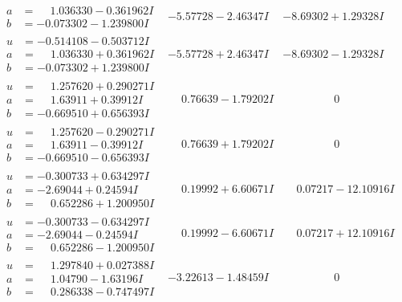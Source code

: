 \documentclass[1p]{elsarticle_modified}
\theoremstyle{definition}
\begin{document}
$$\begin{array}{c|c|c}
\begin{aligned}
a &= \phantom{-}1.036330 - 0.361962 I \\
b &= -0.073302 - 1.239800 I\end{aligned}
 & -5.57728 - 2.46347 I & -8.69302 + 1.29328 I \\ \hline\begin{aligned}
u &= -0.514108 - 0.503712 I \\
a &= \phantom{-}1.036330 + 0.361962 I \\
b &= -0.073302 + 1.239800 I\end{aligned}
 & -5.57728 + 2.46347 I & -8.69302 - 1.29328 I \\ \hline\begin{aligned}
u &= \phantom{-}1.257620 + 0.290271 I \\
a &= \phantom{-}1.63911 + 0.39912 I \\
b &= -0.669510 + 0.656393 I\end{aligned}
 & \phantom{-}0.76639 - 1.79202 I & \phantom{-0.000000 } 0 \\ \hline\begin{aligned}
u &= \phantom{-}1.257620 - 0.290271 I \\
a &= \phantom{-}1.63911 - 0.39912 I \\
b &= -0.669510 - 0.656393 I\end{aligned}
 & \phantom{-}0.76639 + 1.79202 I & \phantom{-0.000000 } 0 \\ \hline\begin{aligned}
u &= -0.300733 + 0.634297 I \\
a &= -2.69044 + 0.24594 I \\
b &= \phantom{-}0.652286 + 1.200950 I\end{aligned}
 & \phantom{-}0.19992 + 6.60671 I & \phantom{-}0.07217 - 12.10916 I \\ \hline\begin{aligned}
u &= -0.300733 - 0.634297 I \\
a &= -2.69044 - 0.24594 I \\
b &= \phantom{-}0.652286 - 1.200950 I\end{aligned}
 & \phantom{-}0.19992 - 6.60671 I & \phantom{-}0.07217 + 12.10916 I \\ \hline\begin{aligned}
u &= \phantom{-}1.297840 + 0.027388 I \\
a &= \phantom{-}1.04790 - 1.63196 I \\
b &= \phantom{-}0.286338 - 0.747497 I\end{aligned}
 & -3.22613 - 1.48459 I & \phantom{-0.000000 } 0 \\ \hline\begin{aligned}

\end{aligned}
\end{array}$$
\end{document}
